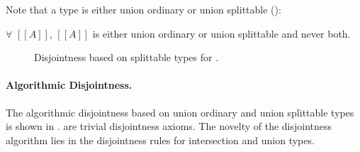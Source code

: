 \noindent Note that a type is either union ordinary or union splittable
():

\begin{lemma}
  $\forall$ $[[A]]$, $[[A]]$ is either union ordinary or union splittable and never both.
\label{lemma:union:exclus:uo:usp}
\end{lemma}








\begin{figure}[t]
  \begin{small}
    \centering
  \end{small}
  \caption{Disjointness based on splittable types for \name.}
  \label{fig:union:rev:disj}
\end{figure}


\paragraph{Algorithmic Disjointness.}
The algorithmic disjointness based on union ordinary and union 
splittable types is shown in .
 are
trivial disjointness axioms. The novelty of the disjointness 
algorithm lies in the disjointness rules for intersection and union types.

